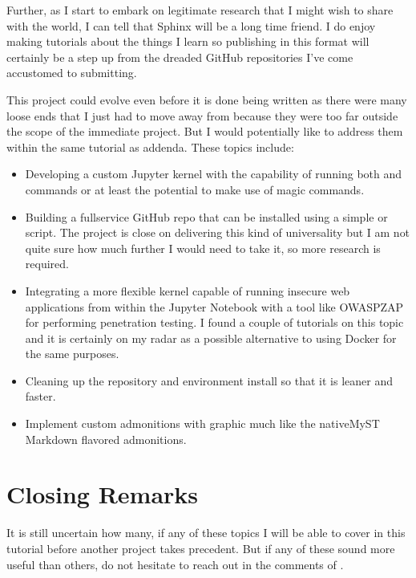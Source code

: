 \documentclass[letterpaper,12pt,english]{sphinxmanual}
\begin{document}
\sphinxAtStartPar
Further, as I start to embark on legitimate research that I might wish to share with the world, I can tell that Sphinx will be a long time friend. I do enjoy making tutorials about the things I learn so publishing in this format will certainly be a step up from the dreaded GitHub  repositories I’ve come accustomed to submitting.

\sphinxAtStartPar
This project could evolve even before it is done being written as there were many loose ends that I just had to move away from because they were too far outside the scope of the immediate project. But I would potentially like to address them within the same tutorial as addenda. These topics include:
\begin{itemize}
\item {} 
\sphinxAtStartPar
Developing a custom Jupyter kernel with the capability of running both  and  commands or at least the potential to make use of  magic commands.

\item {} 
\sphinxAtStartPar
Building a full\sphinxhyphen{}service GitHub repo that can be installed using a simple  or  script. The project is close on delivering this kind of universality but I am not quite sure how much further I would need to take it, so more research is required.

\item {} 
\sphinxAtStartPar
Integrating a more flexible  kernel capable of running insecure web applications from within the Jupyter Notebook with a tool like OWASP\sphinxhyphen{}ZAP for performing penetration testing. I found a couple of tutorials on this topic and it is certainly on my radar as a possible alternative to using Docker for the same purposes.

\item {} 
\sphinxAtStartPar
Cleaning up the repository and environment install so that it is leaner and faster.

\item {} 
\sphinxAtStartPar
Implement custom admonitions with graphic much like the native\sphinxhyphen{}MyST Markdown flavored admonitions.

\end{itemize}


\section{Closing Remarks}
\label{\detokenize{_notebooks/00-the-goal:closing-remarks}}
\sphinxAtStartPar
It is still uncertain how many, if any of these topics I will be able to cover in this tutorial before another project takes precedent. But if any of these sound more useful than others, do not hesitate to reach out in the comments of .
\end{document}

